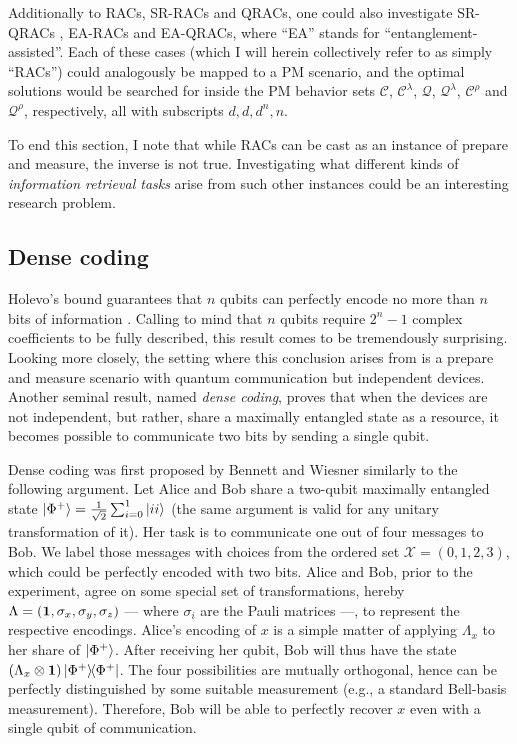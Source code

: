             Additionally to RACs, SR-RACs and QRACs, one could also investigate SR-QRACs \cite{ambainis_srqracs_2009}, EA-RACs \cite{pawlowski_earacs_2010} and EA-QRACs, where ``EA'' stands for ``entanglement-assisted''. Each of these cases (which I will herein collectively refer to as simply ``RACs'') could analogously be mapped to a PM scenario, and the optimal solutions would be searched for inside the PM behavior sets $\mathcal{C}$, $\mathcal{C}^\lambda$, $\mathcal{Q}$, $\mathcal{Q}^\lambda$, $\mathcal{C}^\rho$ and $\mathcal{Q}^\rho$, respectively, all with subscripts $d,d,d^n,n$.

            To end this section, I note that while RACs can be cast as an instance of prepare and measure, the inverse is not true. Investigating what different kinds of \emph{information retrieval tasks} \cite{emeriau_torpedo_2020} arise from such other instances could be an interesting research problem.

        \subsection{Dense coding}
        \label{sec:dense-coding}

            Holevo's bound guarantees that $n$ qubits can perfectly encode no more than $n$ bits of information \cite{holevo-bound-1973}. Calling to mind that $n$ qubits require $2^n - 1$ complex coefficients to be fully described, this result comes to be tremendously surprising. Looking more closely, the setting where this conclusion arises from is a prepare and measure scenario with quantum communication but independent devices. Another seminal result, named \emph{dense coding}, proves that when the devices are not independent, but rather, share a maximally entangled state as a resource, it becomes possible to communicate two bits by sending a single qubit.

            Dense coding was first proposed by Bennett and Wiesner \cite{bennett_1992_superdense} similarly to the following argument. Let Alice and Bob share a two-qubit maximally entangled state $\ket{\Phi^+} = \frac{1}{\sqrt{2}} \sum_{i = 0}^{1} \ket{ii}$ (the same argument is valid for any unitary transformation of it). Her task is to communicate one out of four messages to Bob. We label those messages with choices from the ordered set $\mathcal{X} = (0, 1, 2, 3)$, which could be perfectly encoded with two bits. Alice and Bob, prior to the experiment, agree on some special set of transformations, hereby $\Lambda = (\mathbf{1},\sigma_x, \sigma_y, \sigma_z)$ --- where $\sigma_i$ are the Pauli matrices ---, to represent the respective encodings. Alice's encoding of $x$ is a simple matter of applying $\Lambda_x$ to her share of $\ket{\Phi^+}$. After receiving her qubit, Bob will thus have the state $\left( \Lambda_x \otimes \mathbf{1} \right) \ketbra{\Phi^+}{\Phi^+}$. The four possibilities are mutually orthogonal, hence can be perfectly distinguished by some suitable measurement (e.g., a standard Bell-basis measurement). Therefore, Bob will be able to perfectly recover $x$ even with a single qubit of communication.
            
